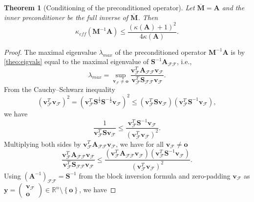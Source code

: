 \documentclass[11pt]{article}
\theoremstyle{plain}
\newtheorem{theorem}{Theorem}[section]
\theoremstyle{definition}
\newcommand{\Vo}{\bm{o}}
\newcommand{\Vv}{\bm{v}}
\newcommand{\Vy}{\bm{y}}
\newcommand{\MA}{\bm{A}}
\newcommand{\MM}{\bm{M}}
\newcommand{\MS}{\bm{S}}
\begin{document}
\begin{theorem}[Conditioning of the preconditioned operator]
  \label{theo:condsimple}
  Let $\overline{\MM} = \MA$ and the inner preconditioner be the full inverse of $\overline{\MM}$. Then
    \begin{equation*}
      \kappa_{eff}\left(\MM^{-1}\MA\right) \leq \frac{\left( \kappa\left( \MA \right) +1  \right)^{2}}{4\kappa(\MA)}.
    \end{equation*}
\end{theorem}
\begin{proof}
  The maximal eigenvalue $\lambda_{max}$ of the preconditioned operator $\MM^{-1}\MA$ is by \cref{theo:eigvals} equal to the maximal eigenvalue of $\MS^{-1}\MA_{\mathcal{FF}}$, i.e.,
  \begin{equation*}
    \lambda_{max} = \sup_{\Vv_{\mathcal{F}} \neq \Vo} \frac{\Vv_{\mathcal{F}}^{T}\MA_{\mathcal{FF}}\Vv_{\mathcal{F}}}{\Vv_{\mathcal{F}}^{T}\MS_{\mathcal{FF}}\Vv_{\mathcal{F}}}.
  \end{equation*}
  From the Cauchy--Schwarz inequality
  \begin{equation}
    \label{eq:cs}
    \left(\Vv_{\mathcal{F}}^{T}\Vv_{\mathcal{F}}\right)^{2} = \left(\Vv_{\mathcal{F}}^{T}\MS^{\frac{1}{2}}\MS^{-\frac{1}{2}}\Vv_{\mathcal{F}}\right)^{2} \leq \left(\Vv_{\mathcal{F}}^{T}\MS\Vv_{\mathcal{F}}\right) \left(\Vv_{\mathcal{F}}^{T}\MS^{-1}\Vv_{\mathcal{F}}\right),
  \end{equation}
  we have
  \begin{equation*}
    \frac{1}{\Vv_{\mathcal{F}}^{T}\MS\Vv_{\mathcal{F}}} \leq \frac{\Vv_{\mathcal{F}}^{T}\MS^{-1}\Vv_{\mathcal{F}}}{\left(\Vv_{\mathcal{F}}^{T}\Vv_{\mathcal{F}}\right)^{2}}.
  \end{equation*}
  Multiplying both sides by $\Vv_{\mathcal{F}}^{T}\MA_{\mathcal{FF}}\Vv_{\mathcal{F}}$, we have for all $\Vv_{\mathcal{F}} \neq \Vo$
  \begin{equation*}
    \frac{\Vv_{\mathcal{F}}^{T}\MA_{\mathcal{FF}}\Vv_{\mathcal{F}}}{\Vv_{\mathcal{F}}^{T}\MS_{\mathcal{FF}}\Vv_{\mathcal{F}}} \leq
    \frac{\left(\Vv_{\mathcal{F}}^{T}\MA_{\mathcal{FF}}\Vv_{\mathcal{F}}\right) \left(\Vv_{\mathcal{F}}^{T}\MS^{-1}\Vv_{\mathcal{F}}\right)}{\left(\Vv_{\mathcal{F}}^{T}\Vv_{\mathcal{F}}\right)^{2}}.
  \end{equation*}
  Using $\left(\MA^{-1}\right)_\mathcal{FF} = \MS^{-1}$ from the block inversion formula and zero-padding $\Vv_{\mathcal{F}}$ as $\Vy = \begin{pmatrix} \Vv_{\mathcal{F}}\\ \Vo \end{pmatrix} \in \mathbb{R}^{n} \setminus\left\{\Vo\right\}$, we have

\end{proof}
\end{document}
